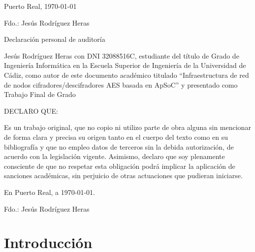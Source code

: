 \documentclass{book}
\begin{document}
{	\bigskip
	\bigskip
	\bigskip
	
	\begin{flushright}
		\large
		Puerto Real, \today
		
		\bigskip    
		\bigskip
		\bigskip
		\bigskip
		\bigskip
		\bigskip
		\bigskip
		\bigskip
		Fdo.: Jesús Rodríguez Heras
		
	\end{flushright}
	
}

\newpage{\pagestyle{empty}\cleardoublepage}  


\begin{center}
	\Large{Declaración personal de auditoría}
\end{center}
Jesús Rodríguez Heras con DNI 32088516C, estudiante del título de Grado de Ingeniería Informática en la Escuela Superior de Ingeniería de la Universidad de Cádiz, como autor de este documento académico titulado ``Infraestructura de red de nodos cifradores/descifradores AES basada en ApSoC'' y presentado como Trabajo Final de Grado

DECLARO QUE:

Es un trabajo original, que no copio ni utilizo parte de obra alguna sin mencionar de forma
clara y precisa su origen tanto en el cuerpo del texto como en su bibliografía y que no empleo datos de terceros sin la debida autorización, de acuerdo con la legislación vigente. Asimismo, declaro que soy plenamente consciente de que no respetar esta obligación podrá implicar la aplicación de sanciones académicas, sin perjuicio de otras actuaciones que pudieran iniciarse.

En Puerto Real, a \today.

\bigskip
\bigskip
\bigskip
\bigskip
\bigskip
Fdo.: Jesús Rodríguez Heras
	
	\newpage{\pagestyle{empty}\cleardoublepage}  
	
%	

	
	\newpage{\pagestyle{empty}\cleardoublepage}  
	
	\newpage{\pagestyle{empty}\cleardoublepage}  
	
	
	\tableofcontents
	\newpage
	\listoffigures
	\newpage
	\listoftables
	\newpage
	
	\part{Introducción}
	
	
	
	
\end{document}
